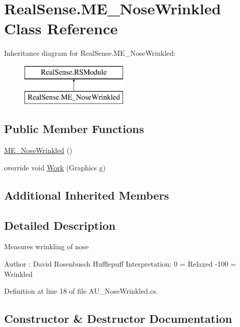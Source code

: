 \hypertarget{class_real_sense_1_1_m_e___nose_wrinkled}{}\section{Real\+Sense.\+M\+E\+\_\+\+Nose\+Wrinkled Class Reference}
\label{class_real_sense_1_1_m_e___nose_wrinkled}
Inheritance diagram for Real\+Sense.\+M\+E\+\_\+\+Nose\+Wrinkled\+:\begin{figure}[H]
\begin{center}
\leavevmode
\includegraphics[height=2.000000cm]{class_real_sense_1_1_m_e___nose_wrinkled}
\end{center}
\end{figure}
\subsection*{Public Member Functions}
\begin{DoxyCompactItemize}
\item 
\hyperlink{class_real_sense_1_1_m_e___nose_wrinkled_ad459ab1a49349e81dac1f7c4f9a71f38}{M\+E\+\_\+\+Nose\+Wrinkled} ()
\item 
override void \hyperlink{class_real_sense_1_1_m_e___nose_wrinkled_a070e88a82095220239ab08848fc5a46b}{Work} (Graphics g)
\end{DoxyCompactItemize}
\subsection*{Additional Inherited Members}


\subsection{Detailed Description}
Measures wrinkling of nose \begin{DoxyAuthor}{Author}
\+: David Rosenbusch  Hufflepuff Interpretation\+: 0 = Relaxed -\/100 = Wrinkled 
\end{DoxyAuthor}


Definition at line 18 of file A\+U\+\_\+\+Nose\+Wrinkled.\+cs.



\subsection{Constructor \& Destructor Documentation}
\mbox{\label{class_real_sense_1_1_m_e___nose_wrinkled_ad459ab1a49349e81dac1f7c4f9a71f38}} 
